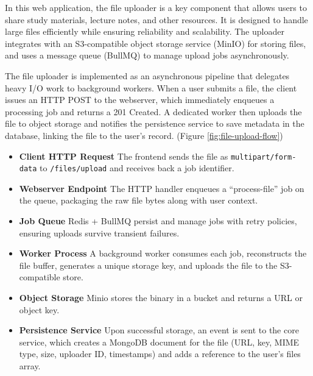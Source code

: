 In this web application, the file uploader is a key component that allows users to share study materials, lecture notes, and other resources. It is designed to handle large files efficiently while ensuring reliability and scalability. The uploader integrates with an S3-compatible object storage service (MinIO) for storing files, and uses a message queue (BullMQ) to manage upload jobs asynchronously.

The file uploader is implemented as an asynchronous pipeline that delegates heavy I/O work to background workers. When a user submits a file, the client issues an HTTP POST to the webserver, which immediately enqueues a processing job and returns a 201 Created. A dedicated worker then uploads the file to object storage and notifies the persistence service to save metadata in the database, linking the file to the user’s record. (Figure \ref{fig:file-upload-flow})

\begin{itemize}
\item \textbf{Client HTTP Request}
The frontend sends the file as \texttt{multipart/form-data} to \texttt{/files/upload} and receives back a job identifier.
\item \textbf{Webserver Endpoint}
The HTTP handler enqueues a “process-file” job on the queue, packaging the raw file bytes along with user context.
\item \textbf{Job Queue}
Redis + BullMQ persist and manage jobs with retry policies, ensuring uploads survive transient failures.
\item \textbf{Worker Process}
A background worker consumes each job, reconstructs the file buffer, generates a unique storage key, and uploads the file to the S3-compatible store.
\item \textbf{Object Storage}
Minio stores the binary in a bucket and returns a URL or object key.
\item \textbf{Persistence Service}
Upon successful storage, an event is sent to the core service, which creates a MongoDB document for the file (URL, key, MIME type, size, uploader ID, timestamps) and adds a reference to the user’s files array.
\end{itemize}

